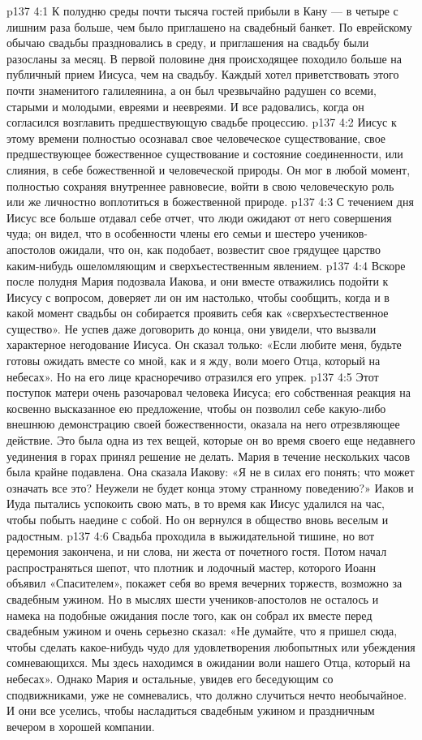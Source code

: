 \vs p137 4:1 К полудню среды почти тысяча гостей прибыли в Кану --- в четыре с лишним раза больше, чем было приглашено на свадебный банкет. По еврейскому обычаю свадьбы праздновались в среду, и приглашения на свадьбу были разосланы за месяц. В первой половине дня происходящее походило больше на публичный прием Иисуса, чем на свадьбу. Каждый хотел приветствовать этого почти знаменитого галилеянина, а он был чрезвычайно радушен со всеми, старыми и молодыми, евреями и неевреями. И все радовались, когда он согласился возглавить предшествующую свадьбе процессию.
\vs p137 4:2 Иисус к этому времени полностью осознавал свое человеческое существование, свое предшествующее божественное существование и состояние соединенности, или слияния, в себе божественной и человеческой природы. Он мог в любой момент, полностью сохраняя внутреннее равновесие, войти в свою человеческую роль или же личностно воплотиться в божественной природе.
\vs p137 4:3 С течением дня Иисус все больше отдавал себе отчет, что люди ожидают от него совершения чуда; он видел, что в особенности члены его семьи и шестеро учеников\hyp{}апостолов ожидали, что он, как подобает, возвестит свое грядущее царство каким\hyp{}нибудь ошеломляющим и сверхъестественным явлением.
\vs p137 4:4 Вскоре после полудня Мария подозвала Иакова, и они вместе отважились подойти к Иисусу с вопросом, доверяет ли он им настолько, чтобы сообщить, когда и в какой момент свадьбы он собирается проявить себя как «сверхъестественное существо». Не успев даже договорить до конца, они увидели, что вызвали характерное негодование Иисуса. Он сказал только: «Если любите меня, будьте готовы ожидать вместе со мной, как и я жду, воли моего Отца, который на небесах». Но на его лице красноречиво отразился его упрек.
\vs p137 4:5 Этот поступок матери очень разочаровал человека Иисуса; его собственная реакция на косвенно высказанное ею предложение, чтобы он позволил себе какую\hyp{}либо внешнюю демонстрацию своей божественности, оказала на него отрезвляющее действие. Это была одна из тех вещей, которые он во время своего еще недавнего уединения в горах принял решение не делать. Мария в течение нескольких часов была крайне подавлена. Она сказала Иакову: «Я не в силах его понять; что может означать все это? Неужели не будет конца этому странному поведению?» Иаков и Иуда пытались успокоить свою мать, в то время как Иисус удалился на час, чтобы побыть наедине с собой. Но он вернулся в общество вновь веселым и радостным.
\vs p137 4:6 \pc Свадьба проходила в выжидательной тишине, но вот церемония закончена, и ни слова, ни жеста от почетного гостя. Потом начал распространяться шепот, что плотник и лодочный мастер, которого Иоанн объявил «Спасителем», покажет себя во время вечерних торжеств, возможно за свадебным ужином. Но в мыслях шести учеников\hyp{}апостолов не осталось и намека на подобные ожидания после того, как он собрал их вместе перед свадебным ужином и очень серьезно сказал: «Не думайте, что я пришел сюда, чтобы сделать какое\hyp{}нибудь чудо для удовлетворения любопытных или убеждения сомневающихся. Мы здесь находимся в ожидании воли нашего Отца, который на небесах». Однако Мария и остальные, увидев его беседующим со сподвижниками, уже не сомневались, что должно случиться нечто необычайное. И они все уселись, чтобы насладиться свадебным ужином и праздничным вечером в хорошей компании.
